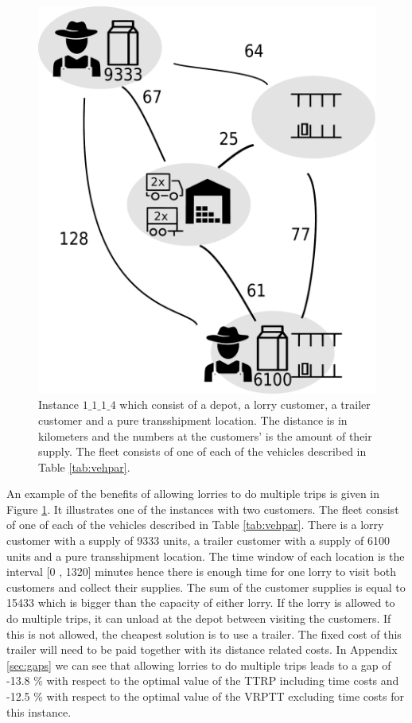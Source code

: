 \begin{figure}[!ht]
  \centering
    \includegraphics[width=.8\textwidth]{img/1_1_1_4.pdf}
  \caption{Instance $1\_1\_1\_4$ which consist of a depot, a lorry customer, a trailer customer and a pure transshipment location. The distance is in kilometers and the numbers at the customers' is the amount of their supply. The fleet consists of one of each of the vehicles described in Table \ref{tab:vehpar}. }
  \label{fig:instance}
\end{figure}

An example of the benefits of allowing lorries to do multiple trips is given in Figure  \ref{fig:instance}. It illustrates one of the instances with two customers. The fleet consist of one of each of the vehicles described in Table \ref{tab:vehpar}. There is a lorry customer with a supply of 9333 units, a trailer customer with a supply of 6100 units and a pure transshipment location. The time window of each location is the interval [0 , 1320] minutes hence there is enough time for one lorry to visit both customers and collect their supplies.
The sum of the customer supplies is equal to 15433 which is bigger than the capacity of either lorry.
If the lorry is allowed to do multiple trips, it can unload at the depot between visiting the customers.
If this is not allowed, the cheapest solution is to use a trailer.
The fixed cost of this trailer will need to be paid together with its distance related costs.
In Appendix \ref{sec:gaps} we can see that allowing lorries to do multiple trips leads to a gap of -13.8 \% with respect to the optimal value of the TTRP including time costs and -12.5 \% with respect to the optimal value of the VRPTT excluding time costs for this instance.


